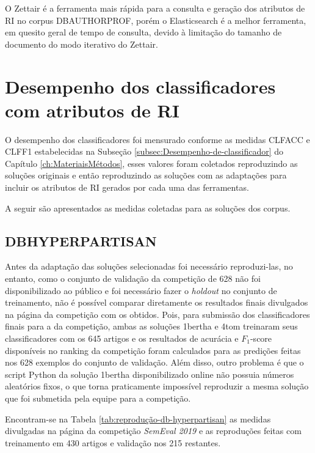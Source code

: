 			O Zettair é a ferramenta mais rápida para a consulta e geração dos atributos de RI no corpus DB\underscore{}AUTHORPROF, porém o Elasticsearch é a melhor ferramenta, em quesito geral de tempo de consulta, devido à limitação do tamanho de documento do modo iterativo do Zettair.

	\section{Desempenho dos classificadores com atributos de RI} \label{sec:DesempenhoClassificadores}
		O desempenho dos classificadores foi mensurado conforme as medidas CLF\underscore{}ACC e CLF\underscore{}F1 estabelecidas na Subseção \ref{subsec:Desempenho-de-classificador} do Capítulo \ref{ch:MateriaisMétodos}, esses valores foram coletados reproduzindo as soluções originais e então reproduzindo as soluções com as adaptações para incluir os atributos de RI gerados por cada uma das ferramentas.

		A seguir são apresentados as medidas coletadas para as soluções dos corpus.

		\subsection{DB\underscore{}HYPERPARTISAN}
			Antes da adaptação das soluções selecionadas foi necessário reproduzi-las, no entanto, como o conjunto de validação da competição de 628 não foi disponibilizado ao público e foi necessário fazer o \textit{holdout} no conjunto de treinamento, não é possível comparar diretamente os resultados finais divulgados na página da competição com os obtidos.
			Pois, para submissão dos classificadores finais para a da competição, ambas as soluções 1\underscore{}bertha e 4\underscore{}tom treinaram seus classificadores com os 645 artigos e os resultados de acurácia e $F_1$-score disponíveis no ranking da competição foram calculados para as predições feitas nos 628 exemplos do conjunto de validação.
			Além disso, outro problema é que o script Python da solução 1\underscore{}bertha disponibilizado online não possuia números aleatórios fixos, o que torna praticamente impossível reproduzir a mesma solução que foi submetida pela equipe para a competição.

			Encontram-se na Tabela \ref{tab:reprodução-db-hyperpartisan} as medidas divulgadas na página da competição \textit{SemEval 2019} \cite{PAN_HNDLEADERBOARD_2019} e as reproduções feitas com treinamento em 430 artigos e validação nos 215 restantes.

